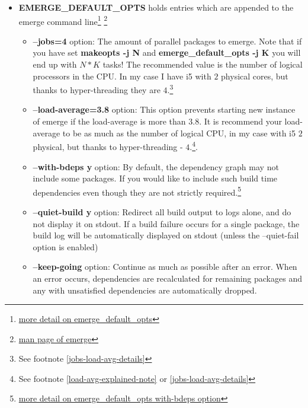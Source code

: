 \documentclass[10pt,a4paper]{article}
\begin{document}
\begin{enumerate}
\begin{enumerate}[label*=\arabic*.]
\begin{itemize}
				\item \textbf{EMERGE\_DEFAULT\_OPTS} holds entries which are appended to the emerge command line\footnote{ \href{https://wiki.gentoo.org/wiki/EMERGE_DEFAULT_OPTS}{more detail on emerge\_default\_opts}} \footnote{ \href{https://dev.gentoo.org/~zmedico/portage/doc/man/emerge.1.html}{man page of emerge}}

				
				
				\begin{itemize}[label={o}]
					
					\item \textbf{--jobs=4} option: The amount of parallel packages to emerge. Note that if you have set \textbf{makeopts -j N} and \textbf{emerge\_default\_opts -j K} you will end up with $ N*K $ tasks! The recommended value is the number of logical processors in the CPU. In my case I have i5 with $ 2 $ physical cores, but thanks to hyper-threading they are $ 4 $.\footnote{ See footnote \ref{jobs-load-avg-details} }
					
					\item \textbf{--load-average=3.8} option: This option prevents starting new instance of emerge if the load-average is more than $ 3.8 $. It is recommend your load-average to be as much as the number of logical CPU, in my case with i5 $ 2 $ physical, but thanks to hyper-threading - $ 4 $.\footnote{See footnote \ref{load-avg-explained-note} or \ref{jobs-load-avg-details}}.
					
					\item \textbf{--with-bdeps y} option: By default, the dependency graph may not include some packages. If you would like to include such build time dependencies even though they are not strictly required.\footnote{ \href{https://wiki.gentoo.org/wiki/Project:Portage/FAQ\#Why_is_it_that_emerge_does_not_update_all_packages.3F}{more detail on emerge\_default\_opts with-bdeps option}}
					
					\item \textbf{--quiet-build y} option: Redirect all build output to logs alone, and do not display it on stdout. If a build failure occurs for a single package, the build log will be automatically displayed on stdout (unless the --quiet-fail option is enabled)
					
					\item \textbf{--keep-going} option: Continue as much as possible after an error. When an error occurs, dependencies are recalculated for remaining packages and any with unsatisfied dependencies are automatically dropped.
					

\end{itemize}
\end{itemize}
\end{enumerate}
\end{enumerate}
\end{document}
